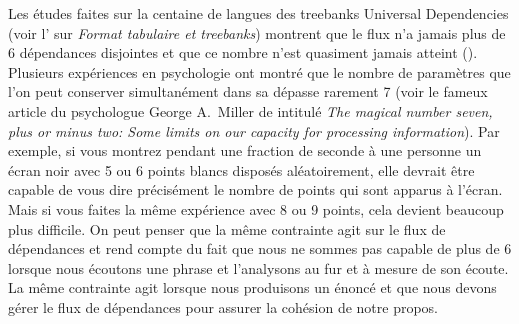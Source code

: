 {    Les études faites sur la centaine de langues des treebanks Universal Dependencies (voir l' sur \textit{Format tabulaire et treebanks})
    montrent que le flux n’a jamais plus de 6 dépendances disjointes et que ce nombre n’est quasiment jamais atteint (\cite{kahane2017limitations}).
    Plusieurs expériences en psychologie ont montré que le nombre de paramètres que l’on peut conserver simultanément dans sa  dépasse rarement 7 (voir le fameux article du psychologue George A.\ Miller de \citeyear{miller1956magical} intitulé \textit{The magical number seven, plus or minus two: Some limits on our capacity for processing information}). Par exemple, si vous montrez pendant une fraction de seconde à une personne un écran noir avec 5 ou 6 points blancs disposés aléatoirement, elle devrait être capable de vous dire précisément le nombre de points qui sont apparus à l’écran. Mais si vous faites la même expérience avec 8 ou 9 points, cela devient beaucoup plus difficile. On peut penser que la même contrainte agit sur le flux de dépendances et rend compte du fait que nous ne sommes pas capable de  plus de 6  lorsque nous écoutons une phrase et l’analysons au fur et à mesure de son écoute. La même contrainte agit lorsque nous produisons un énoncé et que nous devons gérer le flux de dépendances pour assurer la cohésion de notre propos.

}
